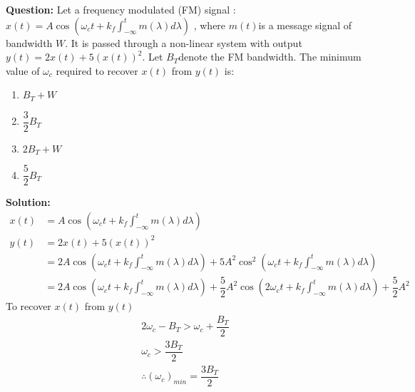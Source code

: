 \documentclass[journal,12pt,twocolumn]{IEEEtran}
\theoremstyle{remark}
\begin{document}
\textbf{Question:} Let a frequency modulated (FM) signal : $ x(t) = A \cos(\omega_c t + k_f \int_{-\infty}^{t} m(\lambda) d\lambda)$ , where $ m(t) $is a message signal of bandwidth $ W $. It is passed through a non-linear system with output $y(t) = 2x(t) + 5(x(t))^2 $.
Let $B_T $denote the FM bandwidth. The minimum value of $ \omega_c $ required to recover $ x(t) $ from $ y(t) $ is:\\
\begin{enumerate}[label = (\Alph*)]
\item $B_T + W$ \\
\item $\dfrac{3}{2} B_T$ \\
\item $2B_T + W$ \\
\item $\dfrac{5}{2} B_T$ \\
\end{enumerate}
\textbf{Solution: }
\begin{align}
 x(t) &= A \cos(\omega_c t + k_f \int_{-\infty}^{t} m(\lambda) d\lambda) \\
 y(t) &= 2x(t) + 5(x(t))^2 \\
 &= 2A \cos(\omega_c t + k_f \int_{-\infty}^{t} m(\lambda) d\lambda) + 5A^{2}\cos^{2}(\omega_c t + k_f \int_{-\infty}^{t} m(\lambda) d\lambda) \\
 &= 2A \cos(\omega_c t + k_f \int_{-\infty}^{t} m(\lambda) d\lambda) + \dfrac{5}{2}A^{2}\cos(2\omega_c t + k_f \int_{-\infty}^{t} m(\lambda) d\lambda) + \dfrac{5}{2}A^{2}
 \end{align}
To recover $x(t)$ from $y(t)$
\begin{align}
2\omega_c - B_T > \omega_c + \dfrac{B_T}{2} \\
\omega_c > \dfrac{3B_T}{2} \\
\therefore(\omega_c)_{min} = \dfrac{3B_T}{2} 
\end{align}
\end{document}
